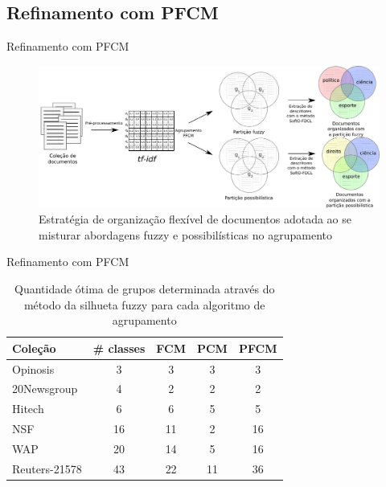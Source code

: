 \documentclass[brazil]{beamer}
\begin{document}
\subsection{Refinamento com PFCM}

\begin{frame}{Refinamento com PFCM}
  \begin{figure}[!htp] 
    \centering
    \includegraphics[width=1.0\columnwidth]{assets/process_pfcm.pdf} 
    \caption{Estratégia de organização flexível de documentos adotada ao se misturar abordagens fuzzy
    e possibilísticas no agrupamento} 
    \label{fig:flexibleorganization} 
  \end{figure}
\end{frame}

\begin{frame}{Refinamento com PFCM}
\begin{table}[!htp]
  \centering
  \begin{tabular}{ |l|c|c|c|c|}
    \hline
    {\bf Coleção} & {\bf \# classes} & {\bf FCM} & {\bf PCM} & {\bf PFCM} \\
    \hline
    Opinosis      & 3 &   \alert{3}   & 3 & {\color{blue}3} \\
    \hline
    20Newsgroup   & 4 &   \alert{2}   & 2 & {\color{blue}2} \\
    \hline
    Hitech        & 6 &   \alert{6}   & 5 & {\color{blue}5} \\
    \hline
    NSF           & 16 &  \alert{11}  & 2 & {\color{blue}16} \\
    \hline
    WAP           & 20 &  \alert{14}  & 5 & {\color{blue}16} \\
    \hline
    Reuters-21578 & 43 &  \alert{22}  & 11 & {\color{blue}36} \\
    \hline
  \end{tabular}
  \caption{Quantidade ótima de grupos determinada através do método da silhueta fuzzy para cada
  algoritmo de agrupamento}
  \label{table:pfcmclusters}
\end{table}
\end{frame}
\end{document}

